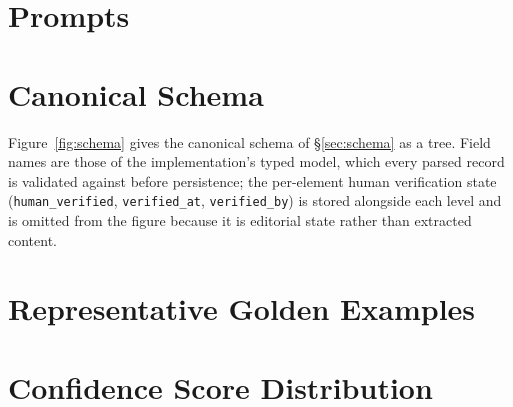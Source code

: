 \documentclass[11pt]{article}
\begin{document}













\appendix

\section{Prompts}
\label{sec:appendix-prompts}



\section{Canonical Schema}
\label{sec:appendix-schema}

Figure~\ref{fig:schema} gives the canonical schema of \S\ref{sec:schema} as a
tree. Field names are those of the implementation's typed model, which every
parsed record is validated against before persistence; the per-element human
verification state (\texttt{human\_verified}, \texttt{verified\_at},
\texttt{verified\_by}) is stored alongside each level and is omitted from the
figure because it is editorial state rather than extracted content.



\section{Representative Golden Examples}
\label{sec:appendix-goldens}



\section{Confidence Score Distribution}
\label{sec:appendix-confidence}
\end{document}
